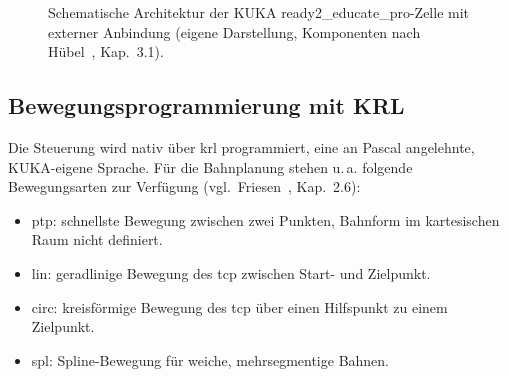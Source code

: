 \begin{figure}[H]
    \centering
    \caption{Schematische Architektur der KUKA ready2\_educate\_pro-Zelle mit
    externer Anbindung (eigene Darstellung, Komponenten nach
    Hübel~\cite{huebel2022}, Kap.~3.1).}
    \label{fig:zelle_architektur}
\end{figure}

\subsection{Bewegungsprogrammierung mit KRL}
\label{sec:krl}

Die Steuerung wird nativ über \ac{krl} programmiert, eine an Pascal
angelehnte, KUKA-eigene Sprache. Für die Bahnplanung stehen u.\,a. folgende
Bewegungsarten zur Verfügung (vgl.\ Friesen~\cite{friesen2021}, Kap.~2.6):

\begin{itemize}
    \item \ac{ptp}: schnellste Bewegung zwischen zwei Punkten, Bahnform im
    kartesischen Raum nicht definiert.
    \item \ac{lin}: geradlinige Bewegung des \ac{tcp} zwischen Start- und
    Zielpunkt.
    \item \ac{circ}: kreisförmige Bewegung des \ac{tcp} über einen
    Hilfspunkt zu einem Zielpunkt.
    \item \ac{spl}: Spline-Bewegung für weiche, mehrsegmentige Bahnen.
\end{itemize}

